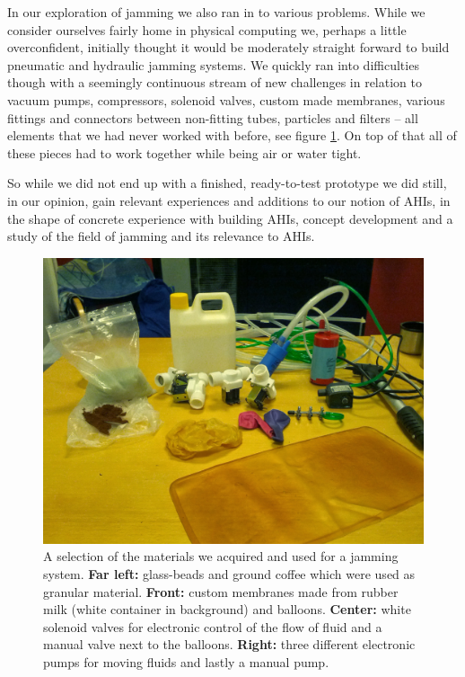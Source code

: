 In our exploration of jamming we also ran in to various problems.
While we consider ourselves fairly home in physical computing we, perhaps a little overconfident, initially thought it would be moderately straight forward to build pneumatic and hydraulic jamming systems.
We quickly ran into difficulties though with a seemingly continuous stream of new challenges in relation to vacuum pumps, compressors, solenoid valves, custom made membranes, various fittings and connectors between non-fitting tubes, particles and filters -- all elements that we had never worked with before, see figure \ref{fig:ch:jamming:materials}.
On top of that all of these pieces had to work together while being air or water tight. 

So while we did not end up with a finished, ready-to-test prototype we did still, in our opinion, gain relevant experiences and additions to our notion of AHIs, in the shape of concrete experience with building AHIs, concept development and a study of the field of jamming and its relevance to AHIs. 

\begin{figure}[h]
	\centering
	\includegraphics[width=.9\linewidth]{figures/jamming/jamming-materials}
	\caption[A selection of the materials for a jamming system]
	{A selection of the materials we acquired and used for a jamming system. \textbf{Far left:} glass-beads and ground coffee which were used as granular material. \textbf{Front:} custom membranes made from rubber milk (white container in background) and balloons. \textbf{Center:} white solenoid valves for electronic control of the flow of fluid and a manual valve next to the balloons. \textbf{Right:} three different electronic pumps for moving fluids and lastly a manual pump.}
	\label{fig:ch:jamming:materials}
\end{figure}

